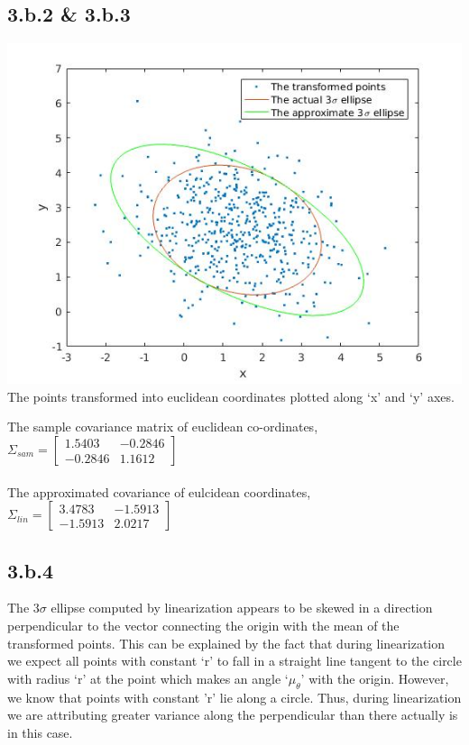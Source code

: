 \documentclass[a4paper,fleqn,11pt]{article}
\theoremstyle{mytheor}
\begin{document}
\subsection*{3.b.2 \& 3.b.3}

\begin{center}
\includegraphics[scale = 0.74]{../images/q3transform.jpg} \\
The points transformed into euclidean coordinates plotted along `x' and `y' axes.
\end{center}

The sample covariance matrix of euclidean co-ordinates,
$\Sigma_{sam} = \begin{bmatrix}
					 1.5403 & -0.2846 \\
					-0.2846 &  1.1612
			    \end{bmatrix}$ \\ \\

The approximated covariance of eulcidean coordinates, 
$\Sigma_{lin} = \begin{bmatrix}
					 3.4783 & -1.5913 \\
					-1.5913 &  2.0217
			    \end{bmatrix}$
			    
\subsection*{3.b.4}

The $3\sigma$ ellipse computed by linearization appears to be skewed in a direction perpendicular to the vector connecting the origin with the mean of the transformed points. This can be explained by the fact that during linearization we expect all points with constant `r' to fall in a straight line tangent to the circle with radius `r' at the point which makes an angle `$\mu_\theta$' with the origin. However, we know that points with constant 'r' lie along a circle. Thus, during linearization we are attributing greater variance along the perpendicular than there actually is in this case.
\end{document}
